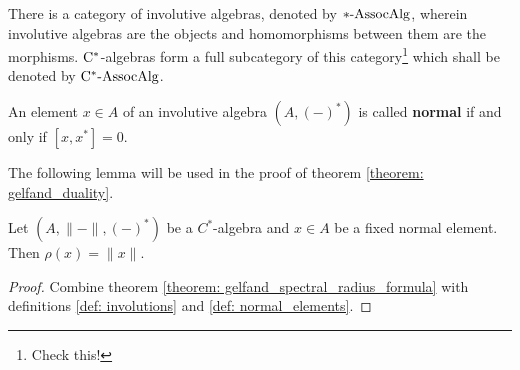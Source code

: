             \begin{convention}
                There is a category of involutive algebras, denoted by $*\text{-}\mathrm{Assoc}\mathrm{Alg}$, wherein involutive algebras are the objects and homomorphisms between them are the morphisms. $\mathrm{C}^*$-algebras form a full subcategory of this category\footnote{Check this!} which shall be denoted by $\mathrm{C}^*\text{-}\mathrm{Assoc}\mathrm{Alg}$. 
            \end{convention}
                
            \begin{definition} \label{def: normal_elements}
                An element $x \in A$ of an involutive algebra $(A, (-)^*)$ is called \textbf{normal} if and only if $[x, x^*] = 0$.
            \end{definition}
            The following lemma will be used in the proof of theorem \ref{theorem: gelfand_duality}.
            \begin{lemma} \label{prop: spectral_radii_and_norms_of_normal_elements}
                Let $(A, \|-\|, (-)^*)$ be a $C^*$-algebra and $x \in A$ be a fixed normal element. Then $\rho(x) = \|x\|$.
            \end{lemma}
                \begin{proof}
                    Combine theorem \ref{theorem: gelfand_spectral_radius_formula} with definitions \ref{def: involutions} and \ref{def: normal_elements}.
                \end{proof}
                
